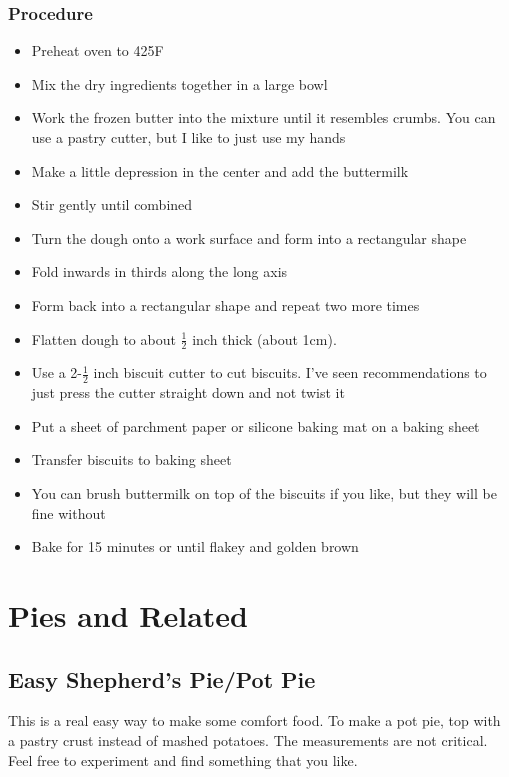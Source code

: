 \documentclass[10pt, openany]{book}
\begin{document}
\subsection{Procedure}
\begin{itemize}
  \item Preheat oven to 425\degrees{}F
  \item Mix the dry ingredients together in a large bowl
  \item Work the frozen butter into the mixture until it resembles crumbs.  You can use a pastry cutter, but I like to just use my hands
  \item Make a little depression in the center and add the buttermilk
  \item Stir gently until combined
  \item Turn the dough onto a work surface and form into a rectangular shape
  \item Fold inwards in thirds along the long axis
  \item Form back into a rectangular shape and repeat two more times
  \item Flatten dough to about $\frac{1}{2}$ inch thick (about 1cm).
  \item Use a 2-$\frac{1}{2}$ inch biscuit cutter to cut biscuits.  I've seen recommendations to just press the cutter straight down and not twist it
  \item Put a sheet of parchment paper or silicone baking mat on a baking sheet
  \item Transfer biscuits to baking sheet
  \item You can brush buttermilk on top of the biscuits if you like, but they will be fine without
  \item Bake for 15 minutes or until flakey and golden brown
\end{itemize}

\chapter{Pies and Related}
\section{Easy Shepherd's Pie/Pot Pie}
\label{pie:ShepherdsPie}
This is a real easy way to make some comfort food.  To make a pot pie, top with a pastry crust instead of mashed potatoes.  The measurements are not critical.  Feel free to experiment and find something that you like.
\end{document}
